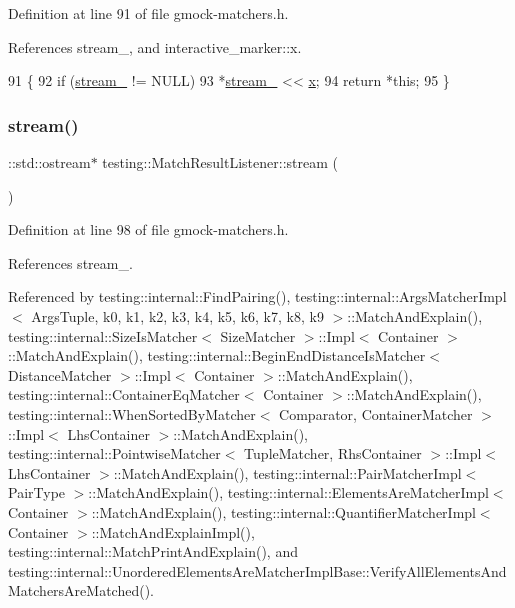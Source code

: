Definition at line 91 of file gmock-\/matchers.\+h.



References stream\+\_\+, and interactive\+\_\+marker\+::x.


\begin{DoxyCode}
91                                               \{
92     \textcolor{keywordflow}{if} (\hyperlink{classtesting_1_1MatchResultListener_a91ff831a7e848af58d44eb3b1801812c}{stream\_} != NULL)
93       *\hyperlink{classtesting_1_1MatchResultListener_a91ff831a7e848af58d44eb3b1801812c}{stream\_} << \hyperlink{namespaceinteractive__marker_acda52804aef30b460a72fb21ee01d69d}{x};
94     \textcolor{keywordflow}{return} *\textcolor{keyword}{this};
95   \}
\end{DoxyCode}
\mbox{\label{classtesting_1_1MatchResultListener_a5abecb247e005f7f50a94898e3f44ee3}} 
\subsubsection{\texorpdfstring{stream()}{stream()}}
{\footnotesize\ttfamily \+::std\+::ostream$\ast$ testing\+::\+Match\+Result\+Listener\+::stream (\begin{DoxyParamCaption}{ }\end{DoxyParamCaption})\hspace{0.3cm}{\ttfamily [inline]}}



Definition at line 98 of file gmock-\/matchers.\+h.



References stream\+\_\+.



Referenced by testing\+::internal\+::\+Find\+Pairing(), testing\+::internal\+::\+Args\+Matcher\+Impl$<$ Args\+Tuple, k0, k1, k2, k3, k4, k5, k6, k7, k8, k9 $>$\+::\+Match\+And\+Explain(), testing\+::internal\+::\+Size\+Is\+Matcher$<$ Size\+Matcher $>$\+::\+Impl$<$ Container $>$\+::\+Match\+And\+Explain(), testing\+::internal\+::\+Begin\+End\+Distance\+Is\+Matcher$<$ Distance\+Matcher $>$\+::\+Impl$<$ Container $>$\+::\+Match\+And\+Explain(), testing\+::internal\+::\+Container\+Eq\+Matcher$<$ Container $>$\+::\+Match\+And\+Explain(), testing\+::internal\+::\+When\+Sorted\+By\+Matcher$<$ Comparator, Container\+Matcher $>$\+::\+Impl$<$ Lhs\+Container $>$\+::\+Match\+And\+Explain(), testing\+::internal\+::\+Pointwise\+Matcher$<$ Tuple\+Matcher, Rhs\+Container $>$\+::\+Impl$<$ Lhs\+Container $>$\+::\+Match\+And\+Explain(), testing\+::internal\+::\+Pair\+Matcher\+Impl$<$ Pair\+Type $>$\+::\+Match\+And\+Explain(), testing\+::internal\+::\+Elements\+Are\+Matcher\+Impl$<$ Container $>$\+::\+Match\+And\+Explain(), testing\+::internal\+::\+Quantifier\+Matcher\+Impl$<$ Container $>$\+::\+Match\+And\+Explain\+Impl(), testing\+::internal\+::\+Match\+Print\+And\+Explain(), and testing\+::internal\+::\+Unordered\+Elements\+Are\+Matcher\+Impl\+Base\+::\+Verify\+All\+Elements\+And\+Matchers\+Are\+Matched().


